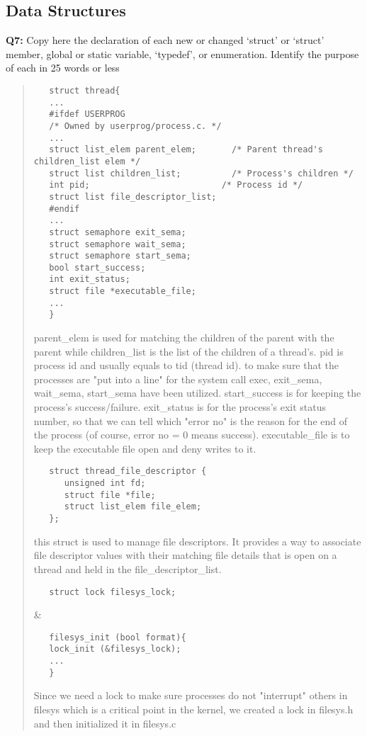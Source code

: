 \documentclass[a4paper,11pt]{paper}
\begin{document}
\subsection{Data Structures}

\textbf{Q7:} Copy here the declaration of each new or changed `struct' or `struct' member, global or static variable, `typedef', or enumeration.  Identify the purpose of each in 25 words or less
\begin{quote}
  \begin{verbatim}
   struct thread{
   ...
   #ifdef USERPROG
   /* Owned by userprog/process.c. */
   ...
   struct list_elem parent_elem;       /* Parent thread's children_list elem */
   struct list children_list;          /* Process's children */
   int pid;                          /* Process id */
   struct list file_descriptor_list;
   #endif
   ...
   struct semaphore exit_sema;
   struct semaphore wait_sema;
   struct semaphore start_sema;
   bool start_success;
   int exit_status;
   struct file *executable_file;
   ...
   }
  \end{verbatim}
  parent\_elem is used for matching the children of the parent with the parent while children\_list is the list of the children of a thread's.
  pid is process id and usually equals to tid (thread id).
  to make sure that the processes are "put into a line" for the system call exec, exit\_sema, wait\_sema, start\_sema have been utilized.
  start\_success is for keeping the process's success/failure.
  exit\_status is for the process's exit status number, so that we can tell which "error no" is the reason for the end of the process (of course, error no = 0 means success).
  executable\_file is to keep the executable file open and deny writes to it.
  \begin{verbatim}
   struct thread_file_descriptor {
      unsigned int fd;
      struct file *file;
      struct list_elem file_elem;
   };
  \end{verbatim}
  this struct is used to manage file descriptors. It provides a way to associate file descriptor values with their matching file details that is open on a thread and held in the file\_descriptor\_list.
  \begin{verbatim}
   struct lock filesys_lock;
  \end{verbatim}
  \&
  \begin{verbatim}
   filesys_init (bool format){
   lock_init (&filesys_lock);
   ...
   }
  \end{verbatim}
  Since we need a lock to make sure processes do not "interrupt" others in filesys which is a critical point in the kernel, we created a lock in filesys.h and then initialized it in filesys.c 
\end{quote}
\end{document}
